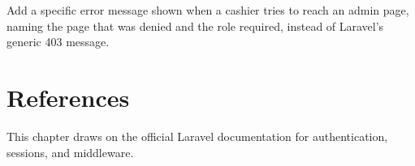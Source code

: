 \begin{challengebox}
Add a specific error message shown when a cashier tries to reach an
admin page, naming the page that was denied and the role required,
instead of Laravel's generic 403 message.
\end{challengebox}

\section{References}

This chapter draws on the official Laravel documentation
\cite{laraveldocs} for authentication, sessions, and middleware.
